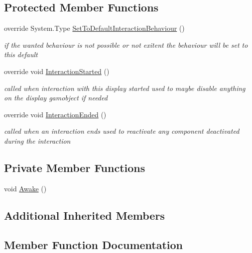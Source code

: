 \subsection*{Protected Member Functions}
\begin{DoxyCompactItemize}
\item 
override System.\+Type \mbox{\hyperlink{class_center_image_display_ac6ddf9c8df99ff76c0f508ba4e45a217}{Set\+To\+Default\+Interaction\+Behaviour}} ()
\begin{DoxyCompactList}\small\item\em if the wanted behaviour is not possible or not exitent the behaviour will be set to this default \end{DoxyCompactList}\item 
override void \mbox{\hyperlink{class_center_image_display_a2944541a38bcc65b7fff15200c9f0fc3}{Interaction\+Started}} ()
\begin{DoxyCompactList}\small\item\em called when interaction with this display started used to maybe disable anything on the display gamobject if needed \end{DoxyCompactList}\item 
override void \mbox{\hyperlink{class_center_image_display_ac78f5ea36aa445bb3d12124f1baf814d}{Interaction\+Ended}} ()
\begin{DoxyCompactList}\small\item\em called when an interaction ends used to reactivate any component deactivated during the interaction \end{DoxyCompactList}\end{DoxyCompactItemize}
\subsection*{Private Member Functions}
\begin{DoxyCompactItemize}
\item 
void \mbox{\hyperlink{class_center_image_display_a413c4767daa6cca041577ba63eb3b8d5}{Awake}} ()
\end{DoxyCompactItemize}
\subsection*{Additional Inherited Members}


\subsection{Member Function Documentation}
\mbox{\label{class_center_image_display_af746f7d72e82809aaa0b5b5bf0ad2cc0}} 
